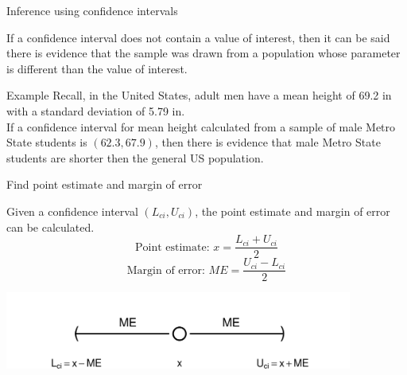 \documentclass[xcolor=table]{beamer}
\begin{document}
\begin{frame}{Inference using confidence intervals}
\begin{block}{}
\large
If a confidence interval does not contain a value of interest, then it can be said there is evidence that the sample was drawn from a population whose parameter is different than the value of interest.
\end{block}

\pause
\begin{exampleblock}{Example}
Recall, in the United States, adult men have a mean height of 69.2 in with a standard deviation of 5.79 in. \\
\medskip
If a confidence interval for mean height calculated from a sample of male Metro State students is $(62.3, 67.9)$, then there is evidence that male Metro State students are shorter then the general US population.
\end{exampleblock}
\end{frame}

\begin{frame}{Find point estimate and margin of error}
\begin{block}{}
\large
Given a confidence interval $(L_{ci}, U_{ci})$, the point estimate and margin of error can be calculated.
\[\text{Point estimate: } x = \frac {L_{ci} + U_{ci}}{2}\]
\[\text{Margin of error: } ME = \frac {U_{ci} - L_{ci}}{2}\]
\end{block}

\medskip
{\centering
\includegraphics[width=4.5in]{../images/ch7_ci_numline}
\par}

\end{frame}
\end{document}
